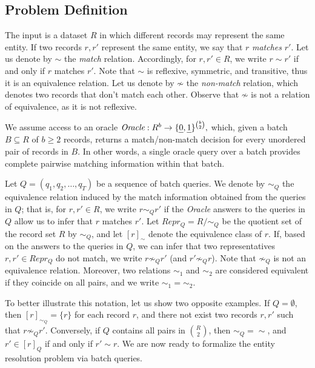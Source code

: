 \documentclass[sigconf, nonacm]{acmart}
\newcommand{\oracle}{\textit{Oracle}\xspace}
\begin{document}
\subsection{Problem Definition}\label{sub:problems}

The input is a dataset $R$ in which different records may represent the same entity. If two records $r,r'$ represent the same entity, we say that $r$ \emph{matches} $r'$. 
Let us denote by $\sim$ the \emph{match} relation. Accordingly, for $r,r'\in R$, we write $r\sim r'$ if and only if $r$ matches $r'$. Note that $\sim$ is reflexive, symmetric, and transitive, thus it is an equivalence relation. Let us denote by $\not\sim$ the \emph{non-match} relation, which denotes two records that don't match each other. Observe that $\not\sim$ is not a relation of equivalence, as it is not reflexive.

We assume access to an oracle
$
\oracle : R^b \to \{\text{\emph{0}}, \text{\emph{1}}\}^{\binom{b}{2}},
$
which, given a batch $B \subseteq R$ of $b \ge 2$ records, returns a match/non-match decision for every unordered pair of records in $B$. 
In other words, a single oracle query over a batch provides complete pairwise matching information within that batch.
  
Let $Q = (q_1, q_2,\ldots,q_T)$ be a sequence of batch queries. 
We denote by $\sim_Q$ the equivalence relation induced by the match information obtained from the queries in $Q$; that is, for $r,r' \in R$, we write $r \sim_Q r'$ if the \oracle answers to the queries in $Q$ allow us to infer that $r$ matches $r'$.
Let $Repr_Q = R/\sim_Q$ be the quotient set of the record set $R$ by $\sim_Q$, and let $[r]_\sim$ denote the equivalence class of $r$. 
If, based on the answers to the queries in $Q$, we can infer that two representatives $r,r' \in Repr_Q$ do not match, we write $r \not\sim_Q r'$ (and $r' \not\sim_Q r$).
Note that $\not\sim_Q$ is not an equivalence relation. Moreover, two relations $\sim_1$ and $\sim_2$ are considered equivalent if they coincide on all pairs, and we write $\sim_1 = \sim_2$. 

To better illustrate this notation, let us show two opposite examples. 
If $Q=\emptyset$, then $[r]_{\sim_Q} = \{r\}$ for each record $r$, and there not exist two records $r,r'$ such that $r\not\sim_Q r'$. Conversely, if $Q$ contains all pairs in ${R\choose 2}$, then $\sim_Q = \sim$, and $r' \in [r]_Q$ if and only if $r'\sim r$. 
We are now ready to formalize the entity resolution problem via batch queries.
\end{document}
